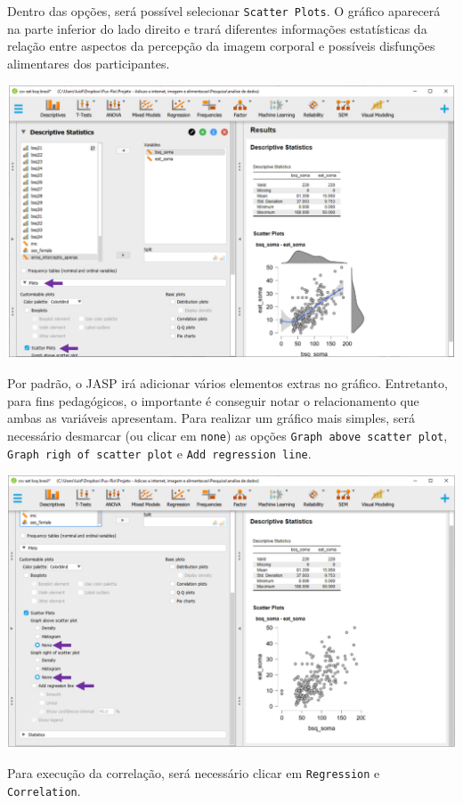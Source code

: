 \documentclass[
]{book}
\begin{document}
Dentro das opções, será possível selecionar \texttt{Scatter\ Plots}. O gráfico aparecerá na parte inferior do lado direito e trará diferentes informações estatísticas da relação entre aspectos da percepção da imagem corporal e possíveis disfunções alimentares dos participantes.

\includegraphics{./img/cap_correlacao_grafico_dispersao.png}

Por padrão, o JASP irá adicionar vários elementos extras no gráfico. Entretanto, para fins pedagógicos, o importante é conseguir notar o relacionamento que ambas as variáveis apresentam. Para realizar um gráfico mais simples, será necessário desmarcar (ou clicar em \texttt{none}) as opções \texttt{Graph\ above\ scatter\ plot}, \texttt{Graph\ righ\ of\ scatter\ plot} e \texttt{Add\ regression\ line}.

\includegraphics{./img/cap_correlacao_grafico_dispersao2.png}

Para execução da correlação, será necessário clicar em \texttt{Regression} e \texttt{Correlation}.
\end{document}

